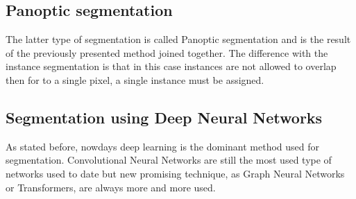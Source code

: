 \subsection{Panoptic segmentation}
The latter type of segmentation is called Panoptic segmentation and is the
result of the previously presented method joined together. The difference with
the instance segmentation is that in this case instances are not allowed to
overlap then for to a single pixel, a single instance must be assigned.

\subsection{Segmentation using Deep Neural Networks}
As stated before, nowdays deep learning is the dominant method used for
segmentation. Convolutional Neural Networks are still the most used type of
networks used to date but new promising technique, as Graph Neural Networks or
Transformers, are always more and more used.
